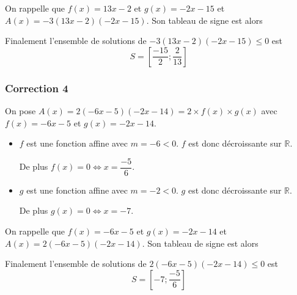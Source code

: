 \documentclass[15pt, mathserif]{beamer}
\begin{document}
\begin{frame}On rappelle que $f(x) = 13x-2$ et $g(x) = -2x-15$ et $A(x) = -3(13x-2)(-2x-15)$. Son tableau de signe est alors 

\medskip \hfil
{}

 Finalement l'ensemble de solutions de $-3(13x-2)(-2x-15)\leq0$ est\[S = \left[\dfrac{-15}{2};\dfrac{2}{13}\right]\]

\end{frame}


\begin{frame}
\vspace{-10mm}
	\frametitle{Correction 4}
On pose $A(x) = 2(-6x-5)(-2x-14) = 2\times f(x) \times g(x)$ avec $f(x) = -6x-5$ et $g(x) = -2x-14$.

\begin{itemize}
	\item $f$ est une fonction affine avec $m =-6<0$. $f$ est donc décroissante sur $\mathbb{R}$.

	 De plus $f(x) = 0 \Leftrightarrow x = \dfrac{-5}{6}$.
	\item $g$ est une fonction affine avec $m =-2<0$. $g$ est donc décroissante sur $\mathbb{R}$.

	 De plus $g(x) = 0 \Leftrightarrow x = -7$.
\end{itemize}

 \end{frame}


\begin{frame}On rappelle que $f(x) = -6x-5$ et $g(x) = -2x-14$ et $A(x) = 2(-6x-5)(-2x-14)$. Son tableau de signe est alors 

\medskip \hfil
{}

 Finalement l'ensemble de solutions de $2(-6x-5)(-2x-14)\leq0$ est\[S = \left[-7;\dfrac{-5}{6}\right]\]

\end{frame}
\end{document}
